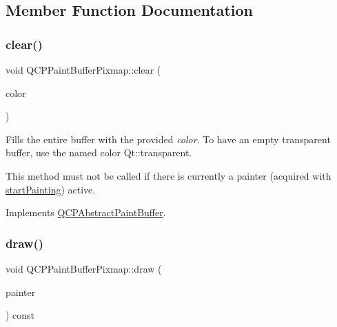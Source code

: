 \subsection{Member Function Documentation}
\mbox{\label{class_q_c_p_paint_buffer_pixmap_a14badbd010a3cde6b55817ccb7b65217}} 
\subsubsection{\texorpdfstring{clear()}{clear()}}
{\footnotesize\ttfamily void Q\+C\+P\+Paint\+Buffer\+Pixmap\+::clear (\begin{DoxyParamCaption}\item[{const Q\+Color \&}]{color }\end{DoxyParamCaption})\hspace{0.3cm}{\ttfamily [virtual]}}

Fills the entire buffer with the provided {\itshape color}. To have an empty transparent buffer, use the named color {\ttfamily Qt\+::transparent}.

This method must not be called if there is currently a painter (acquired with \hyperlink{class_q_c_p_paint_buffer_pixmap_a357964ef7d28cfa530338be4e5c93234}{start\+Painting}) active. 

Implements \hyperlink{class_q_c_p_abstract_paint_buffer_a9e253f4541dfc01992b77e8830bd7722}{Q\+C\+P\+Abstract\+Paint\+Buffer}.

\mbox{\label{class_q_c_p_paint_buffer_pixmap_af7bfc685e56a0a9329e57cd9a265eb74}} 
\subsubsection{\texorpdfstring{draw()}{draw()}}
{\footnotesize\ttfamily void Q\+C\+P\+Paint\+Buffer\+Pixmap\+::draw (\begin{DoxyParamCaption}\item[{\hyperlink{class_q_c_p_painter}{Q\+C\+P\+Painter} $\ast$}]{painter }\end{DoxyParamCaption}) const\hspace{0.3cm}{\ttfamily [virtual]}}

